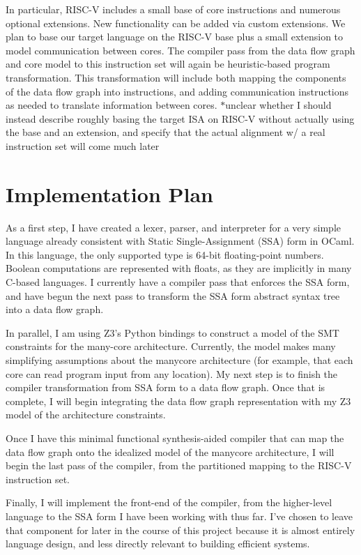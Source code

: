 \documentclass{sig-alternate-05-2015}
\newcommand{\note}{\color{red}$*$}
\begin{document}
In particular, RISC-V includes a small base of core instructions and numerous optional extensions. New functionality can be added via custom extensions. We plan to base our target language on the RISC-V base plus a small extension to model communication between cores. The compiler pass from the data flow graph and core model to this instruction set will again be heuristic-based program transformation. This transformation will include both mapping the components of the data flow graph into instructions, and adding communication instructions as needed to translate information between cores. {\note unclear whether I should instead describe roughly basing the target ISA on RISC-V without actually using the base and an extension, and specify that the actual alignment w/ a real instruction set will come much later}

\section{Implementation Plan}
As a first step, I have created a lexer, parser, and interpreter for a very simple language already consistent with Static Single-Assignment (SSA) form in OCaml. In this language, the only supported type is 64-bit floating-point numbers. Boolean computations are represented with floats, as they are implicitly in many C-based languages. I currently have a compiler pass that enforces the SSA form, and have begun the next pass to transform the SSA form abstract syntax tree into a data flow graph.

In parallel, I am using Z3's Python bindings to construct a model of the SMT constraints for the many-core architecture. Currently, the model makes many simplifying assumptions about the manycore architecture (for example, that each core can read program input from any location). My next step is to finish the compiler transformation from SSA form to a data flow graph. Once that is complete, I will begin integrating the data flow graph representation with my Z3 model of the architecture constraints.

Once I have this minimal functional synthesis-aided compiler that can map the data flow graph onto the idealized model of the manycore architecture, I will begin the last pass of the compiler, from the partitioned mapping to the RISC-V instruction set. 

Finally, I will implement the front-end of the compiler, from the higher-level language to the SSA form I have been working with thus far. I've chosen to leave that component for later in the course of this project because it is almost entirely language design, and less directly relevant to building efficient systems. 
\end{document}
